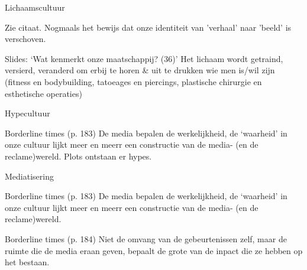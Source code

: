 \documentclass[main.tex]{subfiles}
\begin{document}
\begin{examenvraag}
    \begin{vraag}
        Lichaamscultuur
    \end{vraag}
    \begin{antwoord}
        Zie citaat. Nogmaals het bewijs dat onze identiteit van 'verhaal' naar 'beeld' is verschoven.
        \begin{citaat}{Slides: `Wat kenmerkt onze maatschappij? (36)'}
            Het lichaam wordt getraind, versierd, veranderd om erbij te horen \& uit te drukken wie men is/wil zijn (fitness en 
            bodybuilding, tatoeages en piercings, plastische chirurgie en esthetische operaties)
        \end{citaat}	
    \end{antwoord}
\end{examenvraag}


\begin{examenvraag}
    \begin{vraag}
        Hypecultuur
    \end{vraag}

    \begin{antwoord}
        \begin{citaat}{Borderline times (p. 183)}
            De media bepalen de werkelijkheid, de `waarheid' in onze cultuur lijkt meer en meerr een constructie van de media- (en de reclame)wereld.
            Plots ontstaan er hypes.
        \end{citaat}
    \end{antwoord}
\end{examenvraag}


\begin{examenvraag}
    \begin{vraag}
        Mediatisering
    \end{vraag}

    \begin{antwoord}
        \begin{citaat}{Borderline times (p. 183)}
            De media bepalen de werkelijkheid, de `waarheid' in onze cultuur lijkt meer en meerr een constructie van de media- (en de reclame)wereld.
        \end{citaat}
        \begin{citaat}{Borderline times (p. 184)}
            Niet de omvang van de gebeurtenissen zelf, maar de ruimte die de media eraan geven, bepaalt de grote van de inpact die ze hebben op het bestaan.
        \end{citaat}
    \end{antwoord}
\end{examenvraag}
\end{document}
